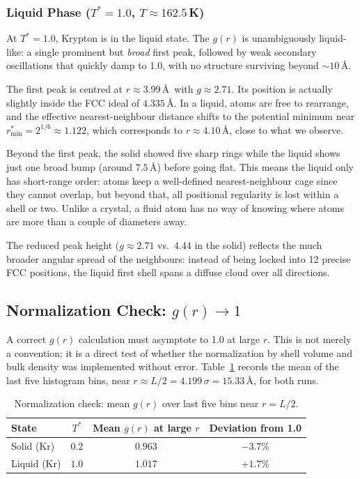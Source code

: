 \subsubsection{Liquid Phase ($T^* = 1.0$, $T \approx 162.5$\,K)}

At $T^* = 1.0$, Krypton is in the liquid state. The $g(r)$ is unambiguously liquid-like: a single prominent but \emph{broad} first peak, followed by weak secondary oscillations that quickly damp to 1.0, with no structure surviving beyond $\sim 10$\,\AA.

The first peak is centred at $r \approx 3.99$\,\AA\ with $g \approx 2.71$. Its position is actually slightly inside the FCC ideal of $4.335$\,\AA. In a liquid, atoms are free to rearrange, and the effective nearest-neighbour distance shifts to the potential minimum near $r^*_\text{min} = 2^{1/6} \approx 1.122$, which corresponds to $r \approx 4.10$\,\AA, close to what we observe.

Beyond the first peak, the solid showed five sharp rings while the liquid shows just one broad bump (around $7.5$\,\AA) before going flat. This means the liquid only has short-range order: atoms keep a well-defined nearest-neighbour cage since they cannot overlap, but beyond that, all positional regularity is lost within a shell or two. Unlike a crystal, a fluid atom has no way of knowing where atoms are more than a couple of diameters away.

The reduced peak height ($g \approx 2.71$ vs.\ $4.44$ in the solid) reflects the much broader angular spread of the neighbours: instead of being locked into 12 precise FCC positions, the liquid first shell spans a diffuse cloud over all directions.

\subsection{Normalization Check: \texorpdfstring{$g(r) \to 1$}{g(r) -> 1}}

A correct $g(r)$ calculation must asymptote to 1.0 at large $r$. This is not merely a convention; it is a direct test of whether the normalization by shell volume and bulk density was implemented without error. Table~\ref{tab:gr_norm} records the mean of the last five histogram bins, near $r \approx L/2 = 4.199\,\sigma = 15.33$\,\AA, for both runs.

\begin{table}[H]
    \centering
    \caption{Normalization check: mean $g(r)$ over last five bins near $r = L/2$.}
    \label{tab:gr_norm}
    \begin{tabular}{lccc}
        \toprule
        \textbf{State}   & \textbf{$T^*$} & \textbf{Mean $g(r)$ at large $r$} & \textbf{Deviation from 1.0} \\
        \midrule
        Solid (Kr)       & $0.2$          & $0.963$                            & $-3.7\%$ \\
        Liquid (Kr)      & $1.0$          & $1.017$                            & $+1.7\%$ \\
        \bottomrule
    \end{tabular}
\end{table}

